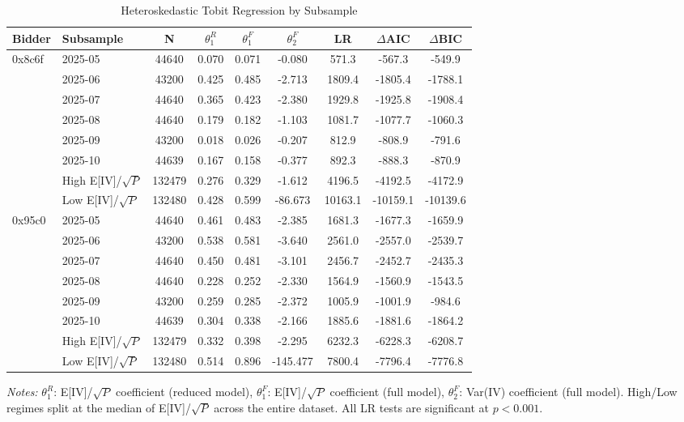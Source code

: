 \documentclass[runningheads]{llncs}
\begin{document}
\begin{table}[htbp]
\centering
\caption{Heteroskedastic Tobit Regression by Subsample}
\label{tab:tobit_subsample}
\footnotesize
\begin{tabular}{llccccccc}
\toprule
Bidder & Subsample & N & $\theta_1^R$ & $\theta_1^F$ & $\theta_2^F$ & LR & $\Delta$AIC & $\Delta$BIC \\
\midrule
0x8c6f & 2025-05 & 44640 & 0.070 & 0.071 & -0.080 & 571.3 & -567.3 & -549.9 \\
 & 2025-06 & 43200 & 0.425 & 0.485 & -2.713 & 1809.4 & -1805.4 & -1788.1 \\
 & 2025-07 & 44640 & 0.365 & 0.423 & -2.380 & 1929.8 & -1925.8 & -1908.4 \\
 & 2025-08 & 44640 & 0.179 & 0.182 & -1.103 & 1081.7 & -1077.7 & -1060.3 \\
 & 2025-09 & 43200 & 0.018 & 0.026 & -0.207 & 812.9 & -808.9 & -791.6 \\
 & 2025-10 & 44639 & 0.167 & 0.158 & -0.377 & 892.3 & -888.3 & -870.9 \\
\addlinespace[0.3em]
 & High E[IV]/$\sqrt{P}$ & 132479 & 0.276 & 0.329 & -1.612 & 4196.5 & -4192.5 & -4172.9 \\
 & Low E[IV]/$\sqrt{P}$ & 132480 & 0.428 & 0.599 & -86.673 & 10163.1 & -10159.1 & -10139.6 \\
\midrule
0x95c0 & 2025-05 & 44640 & 0.461 & 0.483 & -2.385 & 1681.3 & -1677.3 & -1659.9 \\
 & 2025-06 & 43200 & 0.538 & 0.581 & -3.640 & 2561.0 & -2557.0 & -2539.7 \\
 & 2025-07 & 44640 & 0.450 & 0.481 & -3.101 & 2456.7 & -2452.7 & -2435.3 \\
 & 2025-08 & 44640 & 0.228 & 0.252 & -2.330 & 1564.9 & -1560.9 & -1543.5 \\
 & 2025-09 & 43200 & 0.259 & 0.285 & -2.372 & 1005.9 & -1001.9 & -984.6 \\
 & 2025-10 & 44639 & 0.304 & 0.338 & -2.166 & 1885.6 & -1881.6 & -1864.2 \\
\addlinespace[0.3em]
 & High E[IV]/$\sqrt{P}$ & 132479 & 0.332 & 0.398 & -2.295 & 6232.3 & -6228.3 & -6208.7 \\
 & Low E[IV]/$\sqrt{P}$ & 132480 & 0.514 & 0.896 & -145.477 & 7800.4 & -7796.4 & -7776.8 \\
\bottomrule
\end{tabular}
\begin{tablenotes}
\footnotesize
\item \textit{Notes:} $\theta_1^R$: E[IV]/$\sqrt{P}$ coefficient (reduced model), $\theta_1^F$: E[IV]/$\sqrt{P}$ coefficient (full model), $\theta_2^F$: Var(IV) coefficient (full model). High/Low regimes split at the median of E[IV]/$\sqrt{P}$ across the entire dataset. All LR tests are significant at $p<0.001$.
\end{tablenotes}
\end{table}
\end{document}
